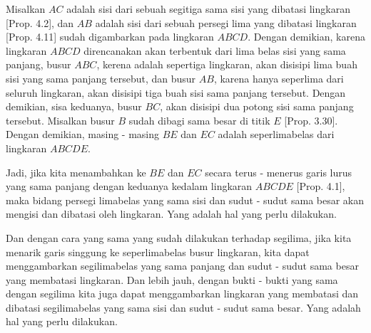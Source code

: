 \documentclass[a4paper]{book}
\begin{document}
Misalkan $AC$ adalah sisi dari sebuah segitiga sama sisi yang dibatasi 
lingkaran [Prop. 4.2], dan $AB$ adalah sisi dari sebuah persegi lima yang 
dibatasi lingkaran [Prop. 4.11] sudah digambarkan pada lingkaran $ABCD$. Dengan
demikian, karena lingkaran $ABCD$ direncanakan akan terbentuk dari lima belas
sisi yang sama panjang, busur $ABC$, kerena adalah sepertiga lingkaran, akan 
disisipi lima buah sisi yang sama panjang tersebut, dan busur $AB$, karena 
hanya seperlima dari seluruh lingkaran, akan disisipi tiga buah sisi sama 
panjang tersebut. Dengan demikian, sisa keduanya, busur $BC$, akan disisipi
dua potong sisi sama panjang tersebut. Misalkan busur $B$ sudah dibagi
sama besar di titik $E$ [Prop. 3.30]. Dengan demikian, masing - masing $BE$ dan
$EC$ adalah seperlimabelas dari lingkaran $ABCDE$.

Jadi, jika kita menambahkan ke $BE$ dan $EC$ secara terus - menerus garis lurus
yang sama panjang dengan keduanya kedalam lingkaran $ABCDE$ [Prop. 4.1], maka
bidang persegi limabelas yang sama sisi dan sudut - sudut sama  besar akan 
mengisi dan dibatasi oleh lingkaran. Yang adalah hal yang perlu dilakukan.

Dan dengan cara yang sama yang sudah dilakukan terhadap segilima, jika kita
menarik garis singgung ke seperlimabelas busur lingkaran, kita dapat 
menggambarkan segilimabelas yang sama panjang dan sudut - sudut sama besar
yang membatasi lingkaran. Dan lebih jauh, dengan bukti - bukti  yang sama
dengan segilima kita juga dapat menggambarkan lingkaran yang membatasi dan 
dibatasi segilimabelas yang sama sisi dan sudut - sudut sama besar. Yang 
adalah hal yang perlu dilakukan.

\end{document}
